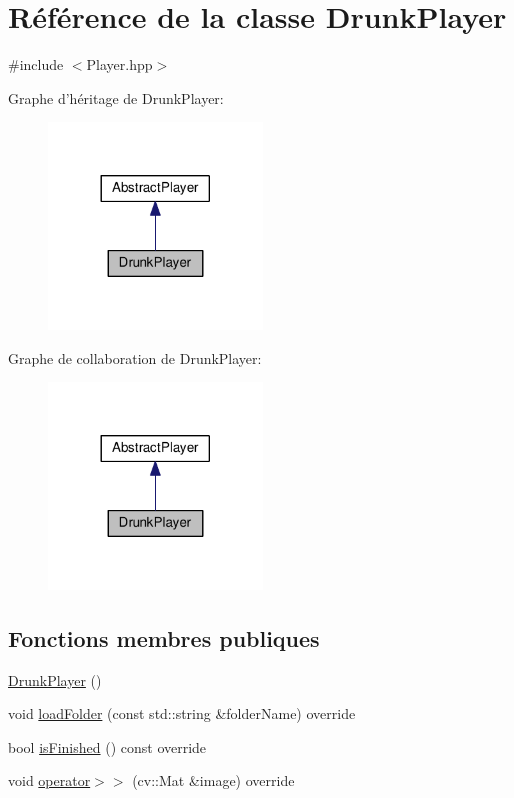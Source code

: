 \hypertarget{classDrunkPlayer}{\section{Référence de la classe Drunk\+Player}
\label{classDrunkPlayer}
}


{\ttfamily \#include $<$Player.\+hpp$>$}



Graphe d'héritage de Drunk\+Player\+:\nopagebreak
\begin{figure}[H]
\begin{center}
\leavevmode
\includegraphics[width=161pt]{classDrunkPlayer__inherit__graph}
\end{center}
\end{figure}


Graphe de collaboration de Drunk\+Player\+:\nopagebreak
\begin{figure}[H]
\begin{center}
\leavevmode
\includegraphics[width=161pt]{classDrunkPlayer__coll__graph}
\end{center}
\end{figure}
\subsection*{Fonctions membres publiques}
\begin{DoxyCompactItemize}
\item 
\hyperlink{classDrunkPlayer_a39c64a774a19456f3a4c194ec5e1131f}{Drunk\+Player} ()
\item 
void \hyperlink{classDrunkPlayer_a235e60ea8a97c4d26277b066c2cebe80}{load\+Folder} (const std\+::string \&folder\+Name) override
\item 
bool \hyperlink{classDrunkPlayer_a9c032dda7df01fafc757fb1f4e265bb4}{is\+Finished} () const override
\item 
void \hyperlink{classDrunkPlayer_a2662f5010e15c95ca6639f56f012aed1}{operator$>$$>$} (cv\+::\+Mat \&image) override
\end{DoxyCompactItemize}
